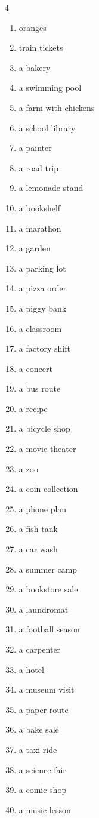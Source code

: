 \documentclass[10pt,a4paper]{article}
\begin{document}
\begin{multicols}{4}
\begin{enumerate}\setlength{\itemsep}{0pt}\setlength{\parskip}{0pt}
\item oranges
\item train tickets
\item a bakery
\item a swimming pool
\item a farm with chickens
\item a school library
\item a painter
\item a road trip
\item a lemonade stand
\item a bookshelf
\item a marathon
\item a garden
\item a parking lot
\item a pizza order
\item a piggy bank
\item a classroom
\item a factory shift
\item a concert
\item a bus route
\item a recipe
\item a bicycle shop
\item a movie theater
\item a zoo
\item a coin collection
\item a phone plan
\item a fish tank
\item a car wash
\item a summer camp
\item a bookstore sale
\item a laundromat
\item a football season
\item a carpenter
\item a hotel
\item a museum visit
\item a paper route
\item a bake sale
\item a taxi ride
\item a science fair
\item a comic shop
\item a music lesson
\end{enumerate}
\end{multicols}
\end{document}
